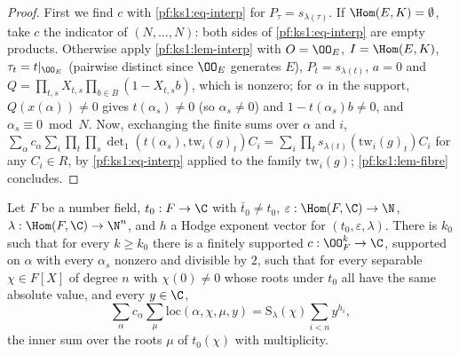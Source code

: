 \begin{proof}
First we find $c$ with \eqref{pf:ks1:eq-interp} for $P_\tau=s_{\lambda(\tau)}$. If
$\Hom(E,K)=\emptyset$, take $c$ the indicator of $(N,\dots,N)$: both sides of \eqref{pf:ks1:eq-interp} are empty products. Otherwise apply
\cref{pf:ks1:lem-interp} with $O=\OO_E$, $I=\Hom(E,K)$, $\tau_t=t|_{\OO_E}$ (pairwise distinct since $\OO_E$ generates $E$), $P_t=s_{\lambda(t)}$,
$a=0$ and $Q=\prod_{t,s}X_{t,s}\prod_{b\in B}(1-X_{t,s}b)$, which is nonzero; for $\alpha$ in the support, $Q(x(\alpha))\neq0$ gives
$t(\alpha_s)\neq0$ (so $\alpha_s\neq0$) and $1-t(\alpha_s)b\neq0$, and $\alpha_s\equiv0\bmod N$. Now, exchanging the finite sums over $\alpha$ and $i$,
$\sum_\alpha c_\alpha\sum_i\prod_t\prod_s\det_1(t(\alpha_s),\mathrm{tw}_i(g)_t)C_i=\sum_i\prod_ts_{\lambda(t)}(\mathrm{tw}_i(g)_t)C_i$ for any
$C_i\in R$, by \eqref{pf:ks1:eq-interp} applied to the family $\mathrm{tw}_i(g)$; \cref{pf:ks1:lem-fibre} concludes.
\end{proof}

\begin{proposition}\label{pf:ks1:prop-rootw}
Let $F$ be a number field, $t_0:F\to\C$ with $\bar t_0\neq t_0$, $\varepsilon:\Hom(F,\C)\to\N$, $\lambda:\Hom(F,\C)\to\N^n$, and $h$ a Hodge
exponent vector for $(t_0,\varepsilon,\lambda)$. There is $k_0$ such that for every $k\ge k_0$ there is a finitely supported
$c:\OO_F^k\to\C$, supported on $\alpha$ with every $\alpha_s$ nonzero and divisible by $2$, such that for every separable $\chi\in F[X]$ of degree
$n$ with $\chi(0)\neq0$ whose roots under $t_0$ all have the same absolute value, and every $y\in\C$,
\begin{equation}\label{pf:ks1:eq-rootw}
\sum_\alpha c_\alpha\sum_{\mu}\mathrm{loc}(\alpha,\chi,\mu,y)=\mathrm{S}_\lambda(\chi)\sum_{i<n}y^{h_i},
\end{equation}
the inner sum over the roots $\mu$ of $t_0(\chi)$ with multiplicity.
\end{proposition}

